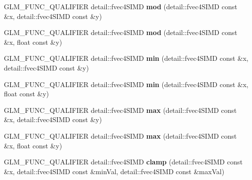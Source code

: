 \begin{DoxyCompactItemize}
\item 
G\+L\+M\+\_\+\+F\+U\+N\+C\+\_\+\+Q\+U\+A\+L\+I\+F\+I\+ER detail\+::fvec4\+S\+I\+MD {\bfseries mod} (detail\+::fvec4\+S\+I\+MD const \&x, detail\+::fvec4\+S\+I\+MD const \&y)\hypertarget{namespaceglm_a560289b95e600d6da427ad473c1f46cf}{}\label{namespaceglm_a560289b95e600d6da427ad473c1f46cf}

\item 
G\+L\+M\+\_\+\+F\+U\+N\+C\+\_\+\+Q\+U\+A\+L\+I\+F\+I\+ER detail\+::fvec4\+S\+I\+MD {\bfseries mod} (detail\+::fvec4\+S\+I\+MD const \&x, float const \&y)\hypertarget{namespaceglm_a66a9b0ed141fd219673b9adf8e400ec0}{}\label{namespaceglm_a66a9b0ed141fd219673b9adf8e400ec0}

\item 
G\+L\+M\+\_\+\+F\+U\+N\+C\+\_\+\+Q\+U\+A\+L\+I\+F\+I\+ER detail\+::fvec4\+S\+I\+MD {\bfseries min} (detail\+::fvec4\+S\+I\+MD const \&x, detail\+::fvec4\+S\+I\+MD const \&y)\hypertarget{namespaceglm_af6ef9739a4145dc0004408132eff235b}{}\label{namespaceglm_af6ef9739a4145dc0004408132eff235b}

\item 
G\+L\+M\+\_\+\+F\+U\+N\+C\+\_\+\+Q\+U\+A\+L\+I\+F\+I\+ER detail\+::fvec4\+S\+I\+MD {\bfseries min} (detail\+::fvec4\+S\+I\+MD const \&x, float const \&y)\hypertarget{namespaceglm_ace53be5aa101f55503d1fd863ac97de3}{}\label{namespaceglm_ace53be5aa101f55503d1fd863ac97de3}

\item 
G\+L\+M\+\_\+\+F\+U\+N\+C\+\_\+\+Q\+U\+A\+L\+I\+F\+I\+ER detail\+::fvec4\+S\+I\+MD {\bfseries max} (detail\+::fvec4\+S\+I\+MD const \&x, detail\+::fvec4\+S\+I\+MD const \&y)\hypertarget{namespaceglm_a8003e838df57188edaa8b8fe512516a6}{}\label{namespaceglm_a8003e838df57188edaa8b8fe512516a6}

\item 
G\+L\+M\+\_\+\+F\+U\+N\+C\+\_\+\+Q\+U\+A\+L\+I\+F\+I\+ER detail\+::fvec4\+S\+I\+MD {\bfseries max} (detail\+::fvec4\+S\+I\+MD const \&x, float const \&y)\hypertarget{namespaceglm_a6a8611ddc96e204e7669872c6a68b972}{}\label{namespaceglm_a6a8611ddc96e204e7669872c6a68b972}

\item 
G\+L\+M\+\_\+\+F\+U\+N\+C\+\_\+\+Q\+U\+A\+L\+I\+F\+I\+ER detail\+::fvec4\+S\+I\+MD {\bfseries clamp} (detail\+::fvec4\+S\+I\+MD const \&x, detail\+::fvec4\+S\+I\+MD const \&min\+Val, detail\+::fvec4\+S\+I\+MD const \&max\+Val)\hypertarget{namespaceglm_a5c4a12e002e5eb23b8a12639c7484378}{}\label{namespaceglm_a5c4a12e002e5eb23b8a12639c7484378}


\end{DoxyCompactItemize}
